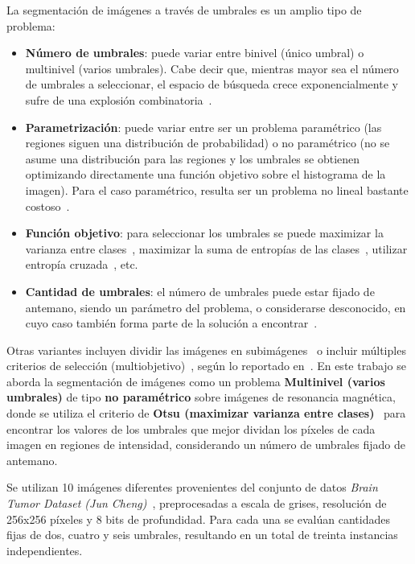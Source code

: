 \documentclass[letter, 10pt]{article}
\begin{document}
La segmentaci\'on de im\'agenes a trav\'es de umbrales es un amplio tipo de problema:
\begin{itemize}
    \item \textbf{N\'umero de umbrales}: puede variar entre binivel (\'unico umbral) o multinivel (varios umbrales). Cabe decir que, mientras mayor sea el n\'umero de umbrales a seleccionar, el espacio de b\'usqueda crece exponencialmente y sufre de una explosi\'on combinatoria~\cite{Hammouche2010Comparative, Manikandan2014Multilevel}.
    \item \textbf{Parametrizaci\'on}: puede variar entre ser un problema param\'etrico (las regiones siguen una distribuci\'on de probabilidad) o no param\'etrico (no se asume una distribuci\'on para las regiones y los umbrales se obtienen optimizando directamente una funci\'on objetivo sobre el histograma de la imagen). Para el caso param\'etrico, resulta ser un problema no lineal bastante costoso~\cite{Hammouche2010Comparative}.
    \item \textbf{Funci\'on objetivo}: para seleccionar los umbrales se puede maximizar la varianza entre clases~\cite{Otsu1979}, maximizar la suma de entrop\'ias de las clases~\cite{Kapur1985, Manikandan2014Multilevel}, utilizar entrop\'ia cruzada~\cite{LiLee1993}, etc.
    \item \textbf{Cantidad de umbrales}: el n\'umero de umbrales puede estar fijado de antemano, siendo un par\'ametro del problema, o considerarse desconocido, en cuyo caso tambi\'en forma parte de la soluci\'on a encontrar~\cite{Hammouche2008Multilevel}.
\end{itemize}

Otras variantes incluyen dividir las im\'agenes en subim\'agenes~\cite{Rahnamayan2006} o incluir m\'ultiples criterios de selecci\'on (multiobjetivo)~\cite{Nakib2007}, seg\'un lo reportado en~\cite{Hammouche2010Comparative}. En este trabajo se aborda la segmentaci\'on de im\'agenes como un problema \textbf{Multinivel (varios umbrales)} de tipo \textbf{no param\'etrico} sobre im\'agenes de resonancia magn\'etica, donde se utiliza el criterio de \textbf{Otsu (maximizar varianza entre clases)}~\cite{Otsu1979} para encontrar los valores de los umbrales que mejor dividan los p\'ixeles de cada imagen en regiones de intensidad, considerando un n\'umero de umbrales fijado de antemano.

Se utilizan 10 im\'agenes diferentes provenientes del conjunto de datos \textit{Brain Tumor Dataset (Jun Cheng)}~\cite{Cheng2017BrainTumor}, preprocesadas a escala de grises, resoluci\'on de 256x256 p\'ixeles y 8 bits de profundidad. Para cada una se eval\'uan cantidades fijas de dos, cuatro y seis umbrales, resultando en un total de treinta instancias independientes.
\end{document}
